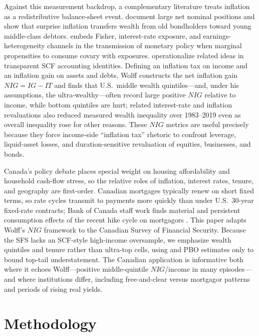 \documentclass[11pt]{article}
\begin{document}
Against this measurement backdrop, a complementary literature treats inflation as a redistributive balance-sheet event. \citet{doepke2006inflation} document large net nominal positions and show that surprise inflation transfers wealth from old bondholders toward young middle-class debtors. \citet{auclert2019redistribution} embeds Fisher, interest-rate exposure, and earnings-heterogeneity channels in the transmission of monetary policy when marginal propensities to consume covary with exposures. \citet{wolff2021inflation,wolff2023inflationtax} operationalize related ideas in transparent SCF accounting identities. Defining an inflation tax on income and an inflation gain on assets and debts, Wolff constructs the net inflation gain $NIG=IG-IT$ and finds that U.S.\ middle wealth quintiles---and, under his assumptions, the ultra-wealthy---often record large positive $NIG$ relative to income, while bottom quintiles are hurt; related interest-rate and inflation revaluations also reduced measured wealth inequality over 1983--2019 even as overall inequality rose for other reasons. These $NIG$ metrics are useful precisely because they force income-side ``inflation tax'' rhetoric to confront leverage, liquid-asset losses, and duration-sensitive revaluation of equities, businesses, and bonds.

Canada's policy debate places special weight on housing affordability and household cash-flow stress, so the relative roles of inflation, interest rates, tenure, and geography are first-order. Canadian mortgages typically renew on short fixed terms, so rate cycles transmit to payments more quickly than under U.S.\ 30-year fixed-rate contracts; Bank of Canada staff work finds material and persistent consumption effects of the recent hike cycle on mortgagors \citep{bouras2024mortgage}. This paper adapts Wolff's $NIG$ framework to the Canadian Survey of Financial Security. Because the SFS lacks an SCF-style high-income oversample, we emphasize wealth quintiles and tenure rather than ultra-top cells, using \citet{hempel2025wealth} and PBO estimates only to bound top-tail understatement. The Canadian application is informative both where it echoes Wolff---positive middle-quintile $NIG$/income in many episodes---and where institutions differ, including free-and-clear versus mortgagor patterns and periods of rising real yields.

\section{Methodology}
\end{document}
